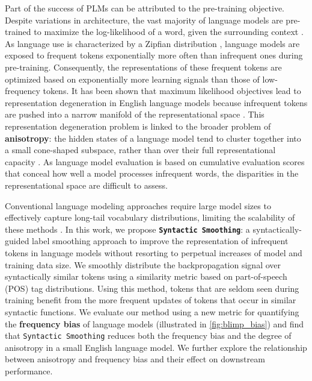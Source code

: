 Part of the success of PLMs can be attributed to the pre-training objective. Despite variations in architecture, the vast majority of language models are pre-trained to maximize the log-likelihood of a word, given the surrounding context \citep{devlin2019bert, brown2020gpt3, chowdhery2023palm, touvron2023llama}. As language use is characterized by a Zipfian distribution \citep{zipf1935zipflaw}, language models are exposed to frequent tokens exponentially more often than infrequent ones during pre-training. Consequently, the representations of these frequent tokens are optimized based on exponentially more learning signals than those of low-frequency tokens. It has been shown that maximum likelihood objectives lead to representation degeneration in English language models because infrequent tokens are pushed into a narrow manifold of the representational space \citep{gao2018representation}. This representation degeneration problem is linked to the broader problem of \textbf{anisotropy}: the hidden states of a language model tend to cluster together into a small cone-shaped subspace, rather than over their full representational capacity \citep{arora2016latent, ethayarajh2019contextual, gao2018representation}. As language model evaluation is based on cumulative evaluation scores that conceal how well a model processes infrequent words, the disparities in the representational space are difficult to assess.  

Conventional language modeling approaches require large model sizes to effectively capture long-tail vocabulary distributions, limiting the scalability of these methods \citep{feldman2020does,haviv2023understanding}. In this work, we propose \textbf{\texttt{Syntactic Smoothing}}: a syntactically-guided label smoothing approach to improve the representation of infrequent tokens in language models without resorting to perpetual increases of model and training data size. We smoothly distribute the backpropagation signal over syntactically similar tokens using a similarity metric based on part-of-speech (POS) tag distributions. Using this method, tokens that are seldom seen during training benefit from the more frequent updates of tokens that occur in similar syntactic functions. 
We evaluate our method using a new metric for quantifying the \textbf{frequency bias} of language models (illustrated in \cref{fig:blimp_bias}) and find that \texttt{Syntactic Smoothing} reduces both the frequency bias and the degree of anisotropy in a small English language model. We further explore the relationship between anisotropy and frequency bias and their effect on downstream performance.

